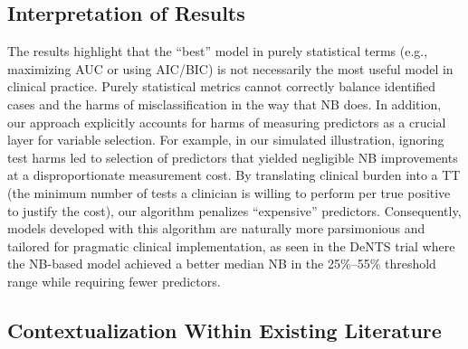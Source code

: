 \subsection{Interpretation of Results}

The results highlight that the ``best'' model in purely statistical terms (e.g., maximizing AUC or using AIC/BIC) is not necessarily the most useful model in clinical practice. Purely statistical metrics cannot correctly balance identified cases and the harms of misclassification in the way that \gls{NB} does. In addition, our approach explicitly accounts for harms of measuring predictors as a crucial layer for variable selection. For example, in our simulated illustration, ignoring test harms led to selection of predictors that yielded negligible \gls{NB} improvements at a disproportionate measurement cost. By translating clinical burden into a TT (the minimum number of tests a clinician is willing to perform per true positive to justify the cost), our algorithm penalizes ``expensive'' predictors. Consequently, models developed with this algorithm are naturally more parsimonious and tailored for pragmatic clinical implementation, as seen in the DeNTS trial where the NB-based model achieved a better median \gls{NB} in the 25\%--55\% threshold range while requiring fewer predictors.

\subsection{Contextualization Within Existing Literature}

